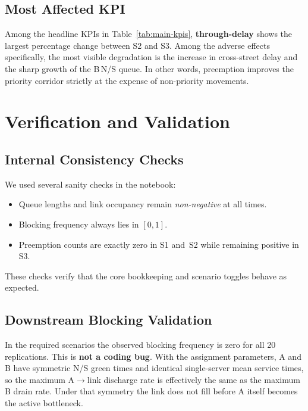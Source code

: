\documentclass[11pt,a4paper]{article}
\begin{document}
\subsection{Most Affected KPI}

Among the headline KPIs in Table~\ref{tab:main-kpis}, \textbf{through-delay} shows the largest percentage change between S2 and S3. Among the adverse effects specifically, the most visible degradation is the increase in cross-street delay and the sharp growth of the B\,N/S queue. In other words, preemption improves the priority corridor strictly at the expense of non-priority movements.

\section{Verification and Validation}
\label{sec:vv}

\subsection{Internal Consistency Checks}

We used several sanity checks in the notebook:
\begin{itemize}[leftmargin=1.2em,itemsep=3pt]
  \item Queue lengths and link occupancy remain \emph{non-negative} at all times.
  \item Blocking frequency always lies in $[0,1]$.
  \item Preemption counts are exactly zero in S1 and~S2 while remaining positive in S3.
\end{itemize}
These checks verify that the core bookkeeping and scenario toggles behave as expected.

\subsection{Downstream Blocking Validation}

\begin{infobox}[Blocking Frequency = 0]
In the required scenarios the observed blocking frequency is zero for all 20 replications. This is \textbf{not a coding bug}. With the assignment parameters, A and B have symmetric N/S green times and identical single-server mean service times, so the maximum A$\rightarrow$link discharge rate is effectively the same as the maximum B drain rate. Under that symmetry the link does not fill before A itself becomes the active bottleneck.
\end{infobox}
\end{document}
